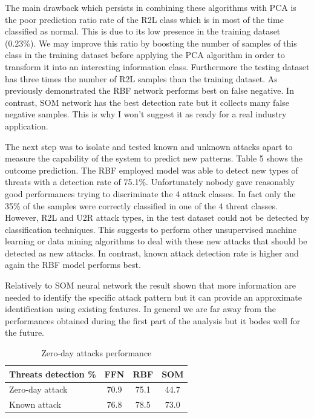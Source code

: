 \documentclass[twocolumn,11pt]{asme2ej}
\begin{document}
The main drawback which persists in combining these algorithms with PCA is the poor prediction ratio rate of the R2L class which is in most of the time classified as normal. This is due to its low presence in the training dataset (0.23\%). We may improve this ratio by boosting the number of samples of this class in the training dataset before applying the PCA algorithm in order to transform it into an interesting information class. Furthermore the testing dataset has three times the number of R2L samples than the training dataset. As previously demonstrated the RBF network performs best on false negative. In contrast, SOM network has the best detection rate but it collects many false negative samples. This is why I won't suggest it as ready for a real industry application.

The next step was to isolate and tested known and unknown attacks apart to measure the capability of the system to predict new patterns. Table 5 shows the outcome prediction. The RBF employed model was able to detect new types of threats with a detection rate of 75.1\%. Unfortunately nobody gave reasonably good performances trying to discriminate the 4 attack classes. In fact only the 35\% of the samples were correctly classified in one of the 4 threat classes. However, R2L and U2R attack types, in the test dataset could not be detected by classification techniques. This suggests to perform other unsupervised machine learning or data mining algorithms to deal with these new attacks that should be detected as new attacks. In contrast, known attack detection rate is higher and again the RBF model performs best.

Relatively to SOM neural network the result shown that more information are needed to identify the specific attack pattern but it can provide an approximate identification using existing features. In general we are far away from the performances obtained during the first part of the analysis but it bodes well for the future.

\begin{table}[t]
\caption{Zero-day attacks performance}
\begin{center}
\label{table_ASME}
\begin{tabular}{l c c c} %
\\\hline
\textbf{Threats detection \%} \hspace{0cm}& \textbf{FFN} \hspace{0cm}& \textbf{RBF} \hspace{0cm}& \textbf{SOM}\\
\hline
Zero-day attack & 70.9 & 75.1 & 44.7\\
Known attack & 76.8 & 78.5 & 73.0\\
\hline
\end{tabular}
\end{center}
\end{table}
\end{document}
